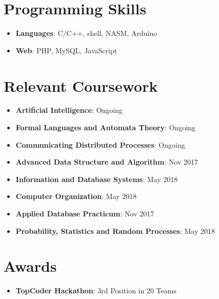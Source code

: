 \documentclass[letterpaper,11pt]{article}
\newcommand{\resumeItem}[2]{
  \item\small{
    \textbf{#1}{: #2 \vspace{-2pt}}
  }
}
\newcommand{\resumeSubItem}[2]{\resumeItem{#1}{#2}\vspace{-4pt}}
\newcommand{\resumeSubHeadingListStart}{\begin{itemize}[leftmargin=*]}
\newcommand{\resumeSubHeadingListEnd}{\end{itemize}}
\begin{document}
\section{Programming Skills}
\resumeSubHeadingListStart
    \resumeSubItem{Languages}
      {C/C++, shell, NASM, Arduino}
    \resumeSubItem{Web}
      {PHP, MySQL, JavaScript}
  \resumeSubHeadingListEnd
  
\section{Relevant Coursework}
  \resumeSubHeadingListStart

    \resumeSubItem
      {Artificial Intelligence}{Ongoing}
     \resumeSubItem
      {Formal Languages and Automata Theory}{Ongoing}
    \resumeSubItem
      {Communicating Distributed Processes}{Ongoing}
      \resumeSubItem
      {Advanced Data Structure and Algorithm}{Nov 2017}
      \resumeSubItem
      {Information and Database Systems}{May 2018}
      \resumeSubItem
      {Computer Organization}{May 2018}
      \resumeSubItem
      {Applied Database Practicum}{Nov 2017}
      \resumeSubItem
      {Probability, Statistics and Random Processes}{May 2018}
    

  \resumeSubHeadingListEnd

\section{Awards}
  \resumeSubHeadingListStart

    \resumeSubItem
    {TopCoder Hackathon}{3rd Position in 20 Teams}

 \resumeSubHeadingListEnd

\end{document}
